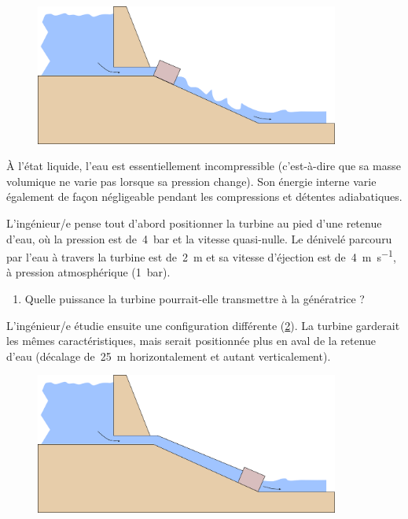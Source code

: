 	\begin{figure}
		\begin{center}
			\includegraphics[width=10cm]{images/water_turbine_1.png}
		\end{center}
		\label{fig_water_turbine_1}
	\end{figure}
	
	À l’état liquide, l’eau est essentiellement incompressible (c’est-à-dire que sa masse volumique ne varie pas lorsque sa pression change). Son énergie interne varie également de façon négligeable pendant les compressions et détentes adiabatiques.
	
	L’ingénieur/e pense tout d’abord positionner la turbine au pied d’une retenue d’eau, où la pression est de~\SI{4}{\bar} et la vitesse quasi-nulle. Le dénivelé parcouru par l’eau à travers la turbine est de~\SI{2}{\metre} et sa vitesse d’éjection est de~\SI{4}{\metre\per\second}, à pression atmosphérique (\SI{1}{\bar}).
	
	\begin{enumerate}
		\item Quelle puissance la turbine pourrait-elle transmettre à la génératrice ?
	\end{enumerate}

	L’ingénieur/e étudie ensuite une configuration différente (\cref{fig_water_turbine_2}). La turbine garderait les mêmes caractéristiques, mais serait positionnée plus en aval de la retenue d’eau (décalage de~\SI{25}{\metre} horizontalement et autant verticalement).
	
	\begin{figure}
		\begin{center}
			\includegraphics[width=10cm]{images/water_turbine_2.png}
		\end{center}
		\label{fig_water_turbine_2}
	\end{figure}

